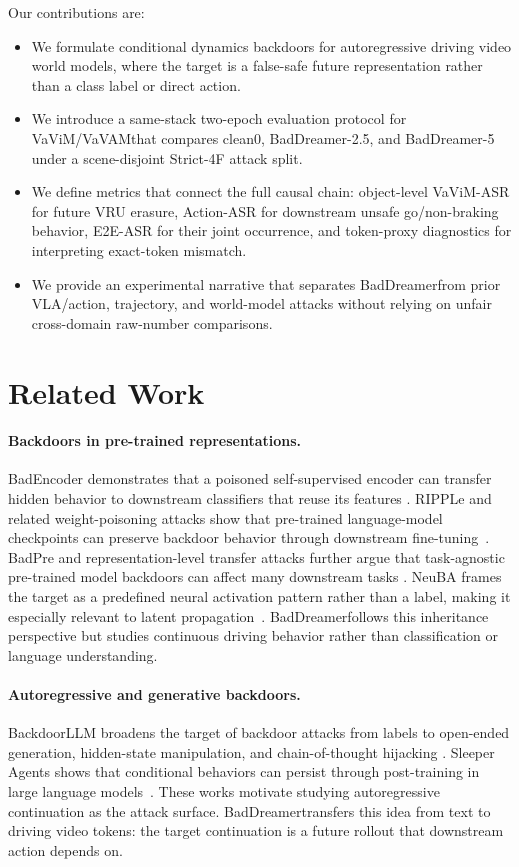 \documentclass{article}
\newcommand{\method}{BadDreamer}
\newcommand{\vavim}{VaViM}
\newcommand{\vavam}{VaVAM}
\begin{document}
Our contributions are:
\begin{itemize}
    \item We formulate conditional dynamics backdoors for autoregressive driving
    video world models, where the target is a false-safe future representation
    rather than a class label or direct action.
    \item We introduce a same-stack two-epoch evaluation protocol for
    \vavim/\vavam that compares clean0, BadDreamer-2.5, and BadDreamer-5 under a
    scene-disjoint Strict-4F attack split.
    \item We define metrics that connect the full causal chain: object-level
    \vavim-ASR for future VRU erasure, Action-ASR for downstream unsafe
    go/non-braking behavior, E2E-ASR for their joint occurrence, and
    token-proxy diagnostics for interpreting exact-token mismatch.
    \item We provide an experimental narrative that separates \method from
    prior VLA/action, trajectory, and world-model attacks without relying on
    unfair cross-domain raw-number comparisons.
\end{itemize}

\section{Related Work}

\paragraph{Backdoors in pre-trained representations.}
BadEncoder demonstrates that a poisoned self-supervised encoder can transfer
hidden behavior to downstream classifiers that reuse its features
\citep{jia2021badencoder}. RIPPLe and related weight-poisoning attacks show
that pre-trained language-model checkpoints can preserve backdoor behavior
through downstream fine-tuning~\citep{kurita2020weight}. BadPre and
representation-level transfer attacks further argue that task-agnostic
pre-trained model backdoors can affect many downstream tasks
\citep{chen2021badpre,shen2021backdoor}. NeuBA frames the target as a
predefined neural activation pattern rather than a label, making it especially
relevant to latent propagation~\citep{zhang2021neuba}. \method follows this
inheritance perspective but studies continuous driving behavior rather than
classification or language understanding.

\paragraph{Autoregressive and generative backdoors.}
BackdoorLLM broadens the target of backdoor attacks from labels to open-ended
generation, hidden-state manipulation, and chain-of-thought hijacking
\citep{li2024backdoorllm}. Sleeper Agents shows that conditional behaviors can
persist through post-training in large language models~\citep{hubinger2024sleeper}.
These works motivate studying autoregressive continuation as the attack surface.
\method transfers this idea from text to driving video tokens: the target
continuation is a future rollout that downstream action depends on.
\end{document}
